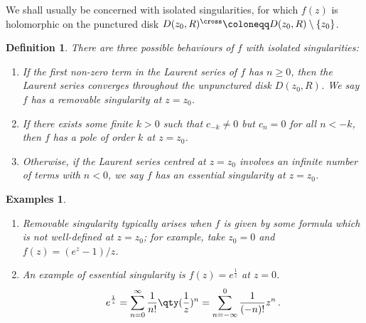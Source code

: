 \documentclass{article}
\theoremstyle{plain}\theoremheaderfont{\normalfont\itshape}\theorembodyfont{\rmfamily}\theoremseparator{.}\newtheorem*{rem}{Remark}\newtheorem*{ex}{Example}\newtheorem*{proof}{Proof}\newtheorem*{altp}{Alternative proof}
\theoremstyle{plain}\theoremheaderfont{\normalfont\bfseries}\theorembodyfont{\rmfamily}\theoremseparator{.}\newtheorem{thm}{Theorem}[section]\newtheorem{lem}[thm]{Lemma}\newtheorem{prop}[thm]{Proposition}\newtheorem*{cor}{Corollary}\newtheorem{defn}[thm]{Definition}\newtheorem{clm}[thm]{Claim}\newtheorem{clminproof}{Claim}
\theoremstyle{break}\theoremheaderfont{\normalfont\itshape}\theorembodyfont{\rmfamily}\theoremseparator{.\medskip}\newtheorem*{proofskip}{Proof}\newtheorem*{exs}{Examples}\newtheorem*{rems}{Remarks}
\theoremstyle{break}\theoremheaderfont{\normalfont\bfseries}\theorembodyfont{\rmfamily}\theoremseparator{.\medskip}\newtheorem{lemskip}[thm]{Lemma}\newtheorem{defnskip}[thm]{Definition}\newtheorem{propskip}[thm]{Proposition}\newtheorem{thmskip}[thm]{Theorem}
\numberwithin{equation}{section}
\begin{document}
	We shall usually be concerned with isolated singularities, for which \(f(z)\) is holomorphic on the punctured disk \(D(z_0,R)^{\cross}\coloneqq D(z_0,R)\setminus\{z_0\}\).
	\begin{defn}
		There are three possible behaviours of \(f\) with isolated singularities:
		\begin{enumerate}[topsep=0pt]
			\item[(i)] If the first non-zero term in the Laurent series of \(f\) has \(n\ge 0\), then the Laurent series converges throughout the unpunctured disk \(D(z_0,R)\). We say \(f\) has a \textit{removable singularity} at \(z=z_0\).
			\item[(ii)] If there exists some finite \(k>0\) such that \(c_{-k}\ne 0\) but \(c_n=0\) for all \(n<-k\), then \(f\) has a \textit{pole of order \(k\)} at \(z=z_0\).
			\item[(iii)] Otherwise, if the Laurent series centred at \(z=z_0\) involves an infinite number of terms with \(n<0\), we say \(f\) has an \textit{essential singularity} at \(z=z_0\).
		\end{enumerate}
	\end{defn}
	\begin{exs}
		\begin{enumerate}[topsep=0pt]
			\item[(i)] Removable singularity typically arises when \(f\) is given by some formula which is not well-defined at \(z=z_0\); for example, take \(z_0=0\) and \(f(z)=(e^z-1)/z\).
			\item[(ii)] An example of essential singularity is \(f(z)=e^{\frac{1}{z}}\) at \(z=0\).
			\[e^{\frac{1}{z}}=\sum_{n=0}^{\infty}\frac{1}{n!}\qty(\frac{1}{z})^n=\sum_{n=-\infty}^{0}\frac{1}{(-n)!}z^n\,.\]
		\end{enumerate}
	\end{exs}
\end{document}
